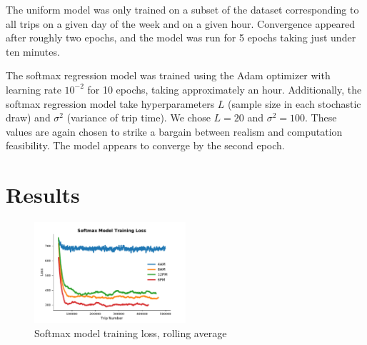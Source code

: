 \documentclass{article}
\begin{document}
The uniform model was only trained on a subset of the
dataset corresponding to all trips on a given day of the week and on a given
hour. Convergence appeared after roughly two epochs, and the model was run for 5
epochs taking just under ten minutes.

The softmax regression model was trained
using the Adam optimizer \cite{kingma2014adam} with learning rate $10^{-2}$ for 10 epochs,
taking approximately an hour. Additionally, the softmax regression model take hyperparameters $L$ (sample size in each stochastic draw) and $\sigma^2$ (variance of trip time). We chose $L = 20$ and $\sigma^2 = 100$. These values are again chosen to strike a bargain between realism and computation feasibility. The model appears to converge by the second epoch. 

\section{Results}




\begin{figure}[h]
\centering
\includegraphics[width=0.5\textwidth]{figs/softmaxloss}
\caption{Softmax model training loss, rolling average}
\label{fig:softmaxloss}
\end{figure}
\end{document}
